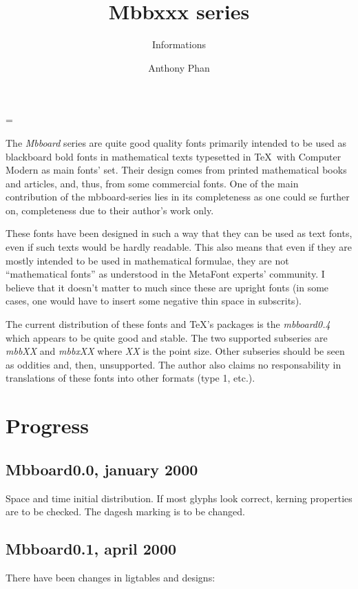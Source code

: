 
\magnification=
\overfullrule=0pt


\begintitle
\title{Mbbxxx series}
\subtitle{Informations}
\author{Anthony Phan}
\endtitle

\nonfrenchspacing

The {\it Mbboard}\/ series are quite good quality fonts primarily intended
to be used as blackboard bold fonts in mathematical texts typesetted
in \TeX\ with Computer Modern as main fonts' set. Their design comes
from printed mathematical books and articles, and, thus, from
some commercial fonts. One of the main contribution of the
mbboard-series lies in its completeness as one could se further on,
completeness due to their author's work only.

These fonts have been designed in such a way that they can be used
as text fonts, even if such texts would be hardly readable.
This also means that even if they are mostly intended to be used
in mathematical formulae, they are not ``mathematical fonts''
as understood in the MetaFont experts' community. I believe that
it doesn't matter to much  since these are upright fonts (in some
cases, one would have to insert some negative thin space in subscrits).

The current distribution of these fonts and \TeX's packages
is the {\it mbboard0.4}\/ which appears to be quite good and
stable. The two supported subseries are {\it mbbXX}\/ and
{\it mbbxXX}\/ where {\it XX}\/ is the point size. Other
subseries should be seen as oddities and, then, unsupported.
The author also claims no responsability in translations
of these fonts into other formats (type 1, etc.).

\section{Progress}

\subsection{Mbboard0.0, january 2000}
Space and time initial distribution.
If most glyphs look correct, kerning
properties are to be checked. The
dagesh marking is to be changed.

\subsection{Mbboard0.1, april 2000}
There have been changes in ligtables and designs:

